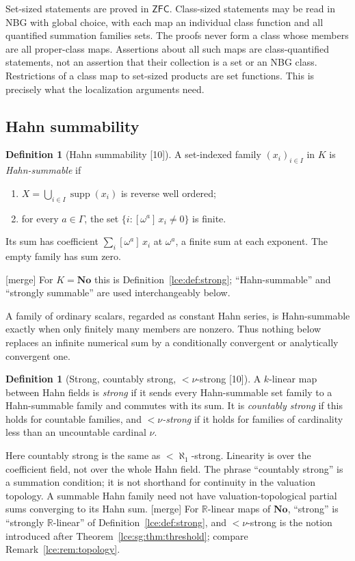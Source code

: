 \documentclass[11pt,letterpaper]{article}
\numberwithin{equation}{section}
\theoremstyle{definition}
\newtheorem{definition}[theorem]{Definition}
\theoremstyle{remark}
\newcommand{\No}{\mathbf{No}}
\newcommand{\R}{\mathbb R}
\newcommand{\supp}{\operatorname{supp}}
\newcommand{\coef}[2]{[\omega^{#1}]\,#2}
\newcommand{\ZFC}{\mathsf{ZFC}}
\newcommand{\thref}[1]{Theorem~\ref{#1}}
\newcommand{\src}[1]{\textup{\textsf{\small[#1]}}}%
\newcommand{\mergetag}{\textup{\textsf{\small[merge]}}}%
\begin{document}
Set-sized statements are proved in $\ZFC$. Class-sized statements may be
read in NBG with global choice, with each map an individual class function
and all quantified summation families sets. The proofs never form a class
whose members are all proper-class maps. Assertions about all such maps are
class-quantified statements, not an assertion that their collection is a
set or an NBG class. Restrictions of a class map to set-sized products are
set functions. This is precisely what the localization arguments need.

\subsection{Hahn summability}
\begin{definition}[Hahn summability \src{10}]\label{lce:mf:def:summable}
A set-indexed family $(x_i)_{i\in I}$ in $K$ is \emph{Hahn-summable} if
\begin{enumerate}[label=\textup{(\roman*)}]
\item $X=\bigcup_{i\in I}\supp(x_i)$ is reverse well ordered;
\item for every $a\in\Gamma$, the set $\{i:\coef a{x_i}\ne0\}$ is finite.
\end{enumerate}
Its sum has coefficient $\sum_i\coef a{x_i}$ at $\omega^a$, a finite sum at
each exponent. The empty family has sum zero.
\end{definition}
\mergetag{} For $K=\No$ this is Definition~\ref{lce:def:strong}; ``Hahn-summable''
and ``strongly summable'' are used interchangeably below.

A family of ordinary scalars, regarded as constant Hahn series, is
Hahn-summable exactly when only finitely many members are nonzero. Thus
nothing below replaces an infinite numerical sum by a conditionally
convergent or analytically convergent one.

\begin{definition}[Strong, countably strong, ${<}\nu$-strong \src{10}]
\label{lce:mf:def:strong}
A $k$-linear map between Hahn fields is \emph{strong} if it sends every
Hahn-summable set family to a Hahn-summable family and commutes with its
sum. It is \emph{countably strong} if this holds for countable families,
and \emph{${<}\nu$-strong} if it holds for families of cardinality less than
an uncountable cardinal $\nu$.
\end{definition}

Here countably strong is the same as ${<}\aleph_1$-strong. Linearity is over
the coefficient field, not over the whole Hahn field. The phrase
``countably strong'' is a summation condition; it is not shorthand for
continuity in the valuation topology. A summable Hahn family need not have
valuation-topological partial sums converging to its Hahn sum.
\mergetag{} For $\R$-linear maps of $\No$, ``strong'' is ``strongly
$\R$-linear'' of Definition~\ref{lce:def:strong}, and ${<}\nu$-strong is the
notion introduced after \thref{lce:sg:thm:threshold}; compare
Remark~\ref{lce:rem:topology}.
\end{document}

